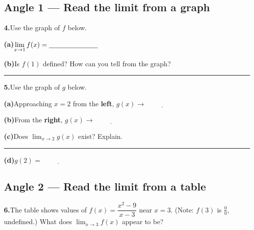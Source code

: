 \documentclass[12pt]{article}
\newcommand{\wl}{\par\vspace{5mm}\noindent\rule{\linewidth}{0.4pt}\par\vspace{1mm}}
\newcommand{\gridaxes}[1]{%
  \draw[step=1,gray!25,very thin] (-#1,-#1) grid (#1,#1);%
  \draw[thick,->] (-#1-0.4,0)--(#1+0.4,0) node[right]{$x$};%
  \draw[thick,->] (0,-#1-0.4)--(0,#1+0.4) node[above]{$y$};%
  \foreach \n in {-#1,...,#1}{\ifnum\n=0\else
      \draw (\n,0.08)--(\n,-0.08) node[below]{\scriptsize$\n$};
      \draw (0.08,\n)--(-0.08,\n) node[left]{\scriptsize$\n$};\fi}%
}
\begin{document}
\subsection*{Angle 1 --- Read the limit from a graph}

\textbf{4.}\quad Use the graph of $f$ below.

\begin{center}
\end{center}

\textbf{(a)}\quad $\displaystyle\lim_{x \to 1} f(x) = \underline{\hspace{2.5cm}}$

\medskip
\textbf{(b)}\quad Is $f(1)$ defined? How can you tell from the graph?
\wl

\newpage
\bigskip
\textbf{5.}\quad Use the graph of $g$ below.

\begin{center}
\end{center}

\textbf{(a)}\quad Approaching $x = 2$ from the \textbf{left}, $g(x) \to \underline{\hspace{2cm}}$\qquad

\textbf{(b)}\quad From the \textbf{right}, $g(x) \to \underline{\hspace{2cm}}$

\medskip
\textbf{(c)}\quad Does $\displaystyle\lim_{x \to 2} g(x)$ exist? Explain.
\wl

\textbf{(d)}\quad $g(2) = \underline{\hspace{2cm}}$

\subsection*{Angle 2 --- Read the limit from a table}

\textbf{6.}\quad The table shows values of $f(x) = \dfrac{x^2 - 9}{\,x - 3\,}$ near $x = 3$. (Note: $f(3)$ is
$\tfrac{0}{0}$, undefined.) What does $\displaystyle\lim_{x \to 3} f(x)$ appear to be?
\end{document}
